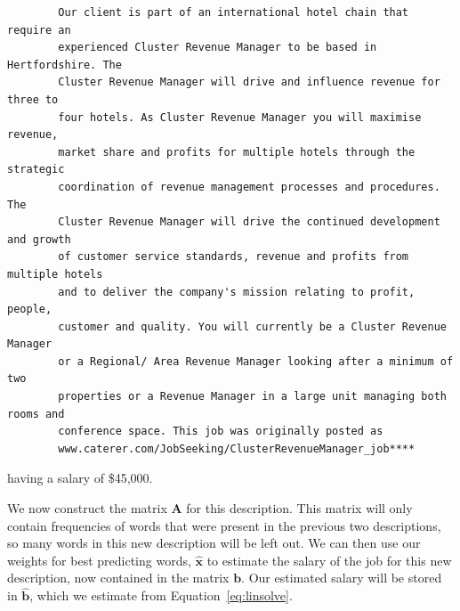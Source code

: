 \documentclass[12pt]{article}
\begin{document}
    \begin{lstlisting}
        Our client is part of an international hotel chain that require an
        experienced Cluster Revenue Manager to be based in Hertfordshire. The
        Cluster Revenue Manager will drive and influence revenue for three to
        four hotels. As Cluster Revenue Manager you will maximise revenue,
        market share and profits for multiple hotels through the strategic
        coordination of revenue management processes and procedures. The
        Cluster Revenue Manager will drive the continued development and growth
        of customer service standards, revenue and profits from multiple hotels
        and to deliver the company's mission relating to profit, people,
        customer and quality. You will currently be a Cluster Revenue Manager
        or a Regional/ Area Revenue Manager looking after a minimum of two
        properties or a Revenue Manager in a large unit managing both rooms and
        conference space. This job was originally posted as
        www.caterer.com/JobSeeking/ClusterRevenueManager_job****
    \end{lstlisting} having a salary of \$45,000.
    
    \begin{center} 
        
        
    \end{center}

    We now construct the matrix $\bm{A}$ for this description. This matrix will
    only contain frequencies of words that were present in the previous two
    descriptions, so many words in this new description will be left out. We
    can then use our weights for best predicting words, $\bm{\hat{x}}$ to
    estimate the salary of the job for this new description, now contained in
    the matrix $\bm{b}$. Our estimated salary will be stored in $\bm{\hat{b}}$,
    which we estimate from Equation~\ref{eq:linsolve}. \\
\end{document}
